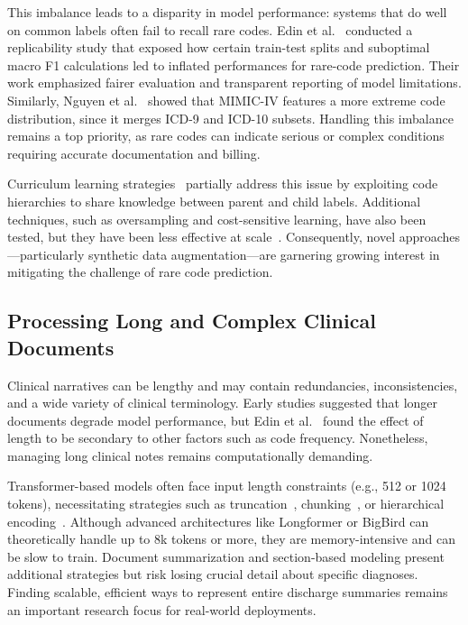 This imbalance leads to a disparity in model performance: systems that do well on common labels often fail to recall rare codes. Edin et al.~\citep{edin2023automated} conducted a replicability study that exposed how certain train-test splits and suboptimal macro F1 calculations led to inflated performances for rare-code prediction. Their work emphasized fairer evaluation and transparent reporting of model limitations. Similarly, Nguyen et al.~\citep{nguyen2023mimicivicd} showed that MIMIC-IV features a more extreme code distribution, since it merges ICD-9 and ICD-10 subsets. Handling this imbalance remains a top priority, as rare codes can indicate serious or complex conditions requiring accurate documentation and billing.

Curriculum learning strategies~\citep{ren2022hicu} partially address this issue by exploiting code hierarchies to share knowledge between parent and child labels. Additional techniques, such as oversampling and cost-sensitive learning, have also been tested, but they have been less effective at scale~\citep{scheurwegs2017data}. Consequently, novel approaches—particularly synthetic data augmentation—are garnering growing interest in mitigating the challenge of rare code prediction.

\subsection{Processing Long and Complex Clinical Documents}

Clinical narratives can be lengthy and may contain redundancies, inconsistencies, and a wide variety of clinical terminology. Early studies suggested that longer documents degrade model performance, but Edin et al.~\citep{edin2023automated} found the effect of length to be secondary to other factors such as code frequency. Nonetheless, managing long clinical notes remains computationally demanding.

Transformer-based models often face input length constraints (e.g., 512 or 1024 tokens), necessitating strategies such as truncation~\citep{gao2021limitations}, chunking~\citep{huang2022plm}, or hierarchical encoding~\citep{heo2022medical}. Although advanced architectures like Longformer or BigBird can theoretically handle up to 8k tokens or more, they are memory-intensive and can be slow to train. Document summarization and section-based modeling present additional strategies but risk losing crucial detail about specific diagnoses. Finding scalable, efficient ways to represent entire discharge summaries remains an important research focus for real-world deployments.

